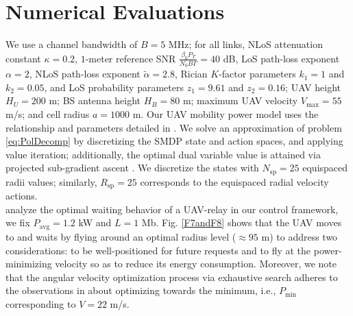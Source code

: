 \documentclass[10pt,twocolumn]{IEEEtran}
\begin{document}
\vspace{-4mm}
\section{Numerical Evaluations}\label{V}
We use a channel bandwidth of $B{=}5$ MHz; for all links, NLoS attenuation constant $\kappa{=}0.2$, $1$-meter reference SNR $\frac{\beta_{0}P_{T}}{N_{0}B\Gamma}{=}40$ dB, LoS path-loss exponent $\alpha{=}2$, NLoS path-loss exponent $\tilde{\alpha}{=}2.8$, Rician $K$-factor parameters $k_{1}{=}1$ and $k_{2}{=}0.05$, and LoS probability parameters $z_{1}{=}9.61$ and $z_{2}{=}0.16$; UAV height $H_{U}{=}200$ m; BS antenna height $H_{B}{=}80$ m; maximum UAV velocity $V_{\mathrm{max}}{=}55$ m/s; and cell radius $a{=}1000$ m. Our UAV mobility power model uses the relationship and parameters detailed in \cite{SCA}. We solve an approximation of problem \eqref{eq:PolDecomp} by discretizing the SMDP state and action spaces, and applying value iteration; additionally, the optimal dual variable value is attained via projected sub-gradient ascent \cite{SubgradientMethods}. We discretize the states with $N_{\mathrm{sp}}{=}25$ equispaced radii values; similarly, $R_{\mathrm{sp}}{=}25$ corresponds to the equispaced radial velocity actions.\\
 analyze the optimal waiting behavior of a UAV-relay in our control framework, we fix $P_{\mathrm{avg}}{=}1.2$ kW and $L{=}1$ Mb. Fig. \ref{F7andF8} shows that the UAV moves to and waits by flying around an optimal radius level (${\approx}95$ m) to address two considerations: to be well-positioned for future requests and to fly at the power-minimizing velocity so as to reduce its energy consumption. Moreover, we note that the angular velocity optimization process via exhaustive search adheres to the observations in \cite{SCA} about optimizing towards the minimum, i.e., $P_{\mathrm{min}}$ corresponding to $V{=}22$ m/s.\\
\end{document}
